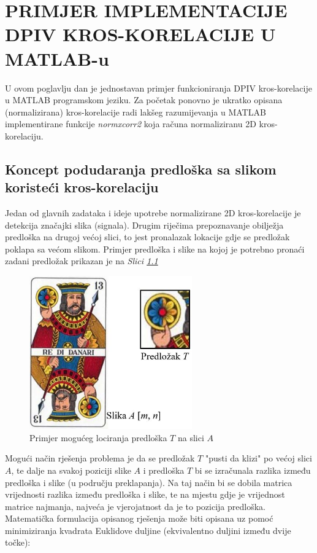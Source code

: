 \chapter{PRIMJER IMPLEMENTACIJE DPIV KROS-KORELACIJE U MATLAB-u}
\label{chap:Poglavlje6}
U ovom poglavlju dan je jednostavan primjer funkcioniranja DPIV kros-korelacije u MATLAB programskom jeziku. Za početak ponovno je ukratko opisana (normalizirana) kros-korelacije radi lakšeg razumijevanja u MATLAB implementirane funkcije \textit{normxcorr2} koja računa normaliziranu 2D kros-korelaciju.
\section{Koncept podudaranja predloška sa slikom koristeći kros-korelaciju}
\label{podudaranjePredlSlika}
Jedan od glavnih zadataka i ideje upotrebe normalizirane 2D kros-korelacije je detekcija značajki slika (signala). Drugim riječima prepoznavanje obilježja predloška na drugoj većoj slici, to jest pronalazak lokacije gdje se predložak poklapa sa većom slikom. Primjer predloška i slike na kojoj je potrebno pronaći zadani predložak prikazan je na \textit{Slici \ref{sl:6.1}}
\begin{figure}[h]  
	\centering
	\includegraphics[width=7cm]{./6_PrimjerKrosKorelacije/slika6_1.jpg} 
	\caption{Primjer mogućeg lociranja predloška $T$ na slici $A$}
	\label{sl:6.1}
\end{figure}
\par
Mogući način rješenja problema je da se predložak $T$ "pusti da klizi" po većoj slici $A$, te dalje na svakoj poziciji slike $A$ i predloška $T$ bi se izračunala razlika između predloška i slike (u području preklapanja). Na taj način bi se dobila matrica vrijednosti razlika između predloška i slike, te na mjestu gdje je vrijednost matrice najmanja, najveća je vjerojatnost da je to pozicija predloška. Matematička formulacija opisanog rješenja može biti opisana uz pomoć minimiziranja kvadrata Euklidove duljine (ekvivalentno duljini između dvije točke):
